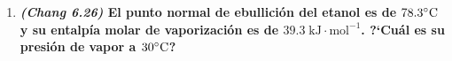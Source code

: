 \documentclass[a4paper,12pt]{article}
\begin{document}
\begin{enumerate}

 \item \textbf{\textit{(Chang 6.26)} El punto normal de ebullici\'on del etanol es de $78.3\celsius$ y su entalp\'ia molar de vaporizaci\'on es de $39.3\;\mbox{kJ}\cdot\mbox{mol}^{-1}$. ?`Cu\'al es su presi\'on de vapor a $30\celsius$?} %


\end{enumerate}
\end{document}

